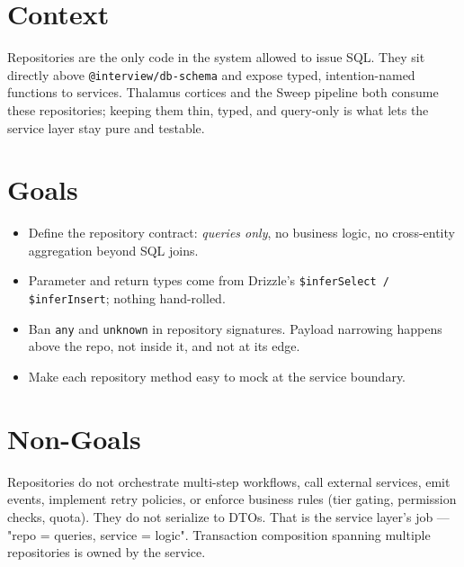 



\makespecheader

\section{Context}
Repositories are the only code in the system allowed to issue SQL. They sit
directly above \texttt{@interview/db-schema} and expose typed, intention-named
functions to services. Thalamus cortices and the Sweep pipeline both consume
these repositories; keeping them thin, typed, and query-only is what lets the
service layer stay pure and testable.

\section{Goals}
\begin{itemize}[leftmargin=1.2em]
  \item Define the repository contract: \emph{queries only}, no business logic,
        no cross-entity aggregation beyond SQL joins.
  \item Parameter and return types come from Drizzle's
        \texttt{\$inferSelect / \$inferInsert}; nothing hand-rolled.
  \item Ban \texttt{any} and \texttt{unknown} in repository signatures. Payload
        narrowing happens above the repo, not inside it, and not at its edge.
  \item Make each repository method easy to mock at the service boundary.
\end{itemize}

\section{Non-Goals}
\begin{nongoal}
Repositories do not orchestrate multi-step workflows, call external services,
emit events, implement retry policies, or enforce business rules (tier gating,
permission checks, quota). They do not serialize to DTOs. That is the service
layer's job --- "repo = queries, service = logic". Transaction composition
spanning multiple repositories is owned by the service.
\end{nongoal}

